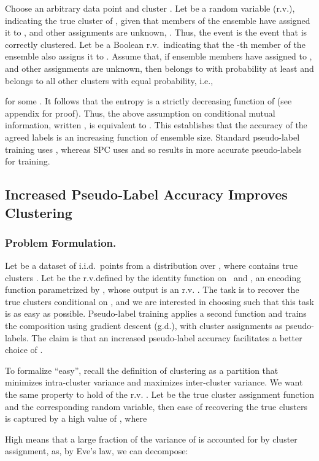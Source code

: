 \documentclass[runningheads]{llncs}
\begin{document}
Choose an arbitrary data point  and cluster . Let  be a random variable (r.v.), indicating the true cluster of , given that  members of the ensemble have assigned it to , and other assignments are unknown, . Thus, the event  is the event that  is correctly clustered. Let  be a Boolean r.v.\ indicating that the \mbox{-th} member of the ensemble also assigns it to . Assume that, if  ensemble members have assigned  to , and other assignments are unknown, then  belongs to  with probability at least  and belongs to all other clusters with equal probability, i.e.,  

for some . 
It follows that the entropy  is a strictly decreasing function of  (see appendix for proof). 
Thus, the above assumption on conditional mutual information, written , is equivalent to . This establishes that the accuracy of the agreed labels is an increasing function of ensemble size. Standard pseudo-label training uses , whereas SPC uses  and so results in more accurate pseudo-labels for training.


\subsection{Increased Pseudo-Label Accuracy Improves Clustering}


\subsubsection{Problem Formulation.}
Let  be a dataset of i.i.d.~points from a distribution over , where  contains  true clusters . Let  be the r.v.defined by the identity function on~ and , an encoding function parametrized by , whose output is an r.v. . The task is to recover the true clusters conditional on , and we are interested in choosing  such that this task is as easy as possible. Pseudo-label training applies a second function  and trains the composition  using gradient descent (g.d.), with cluster assignments as pseudo-labels. The claim is that an increased pseudo-label accuracy facilitates a better choice of . 

 To formalize ``easy'', recall the definition of clustering as a partition that minimizes intra-cluster variance and maximizes inter-cluster variance. We want the same property to hold of the r.v. . Let  be the true cluster assignment function and  the corresponding random variable, then ease of recovering the true clusters is captured by a high value of , where

High  means that a large fraction of the variance of  is accounted for by cluster assignment, as, by Eve's law, we can decompose:
\end{document}
